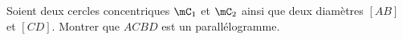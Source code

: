 
\begin{exercice}\label{exo2smath-0113}

    Soient deux cercles concentriques \( \mC_1\) et \( \mC_2\) ainsi que deux diamètres \( [AB]\) et \( [CD]\). Montrer que \( ACBD\) est un parallélogramme.

\end{exercice}
